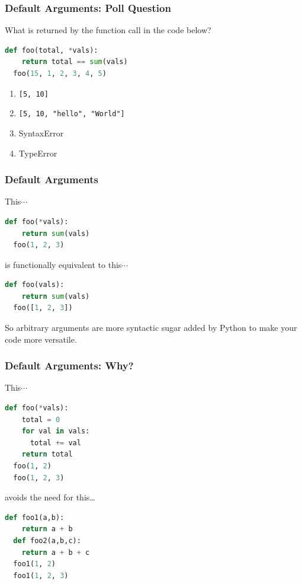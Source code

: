 \documentclass{beamer}
\begin{document}
%
%
\begin{frame}[fragile]
  \frametitle{Default Arguments: Poll Question}
  What is returned by the function call in the code below?
  \begin{lstlisting}[language=Python, autogobble]
  def foo(total, *vals):
    return total == sum(vals)
  foo(15, 1, 2, 3, 4, 5)
  \end{lstlisting}
  \vfill
  \begin{enumerate}[A]
    \item \lstinline|[5, 10]|
    \item \lstinline|[5, 10, "hello", "World"]|
    \item SyntaxError
    \item TypeError
  \end{enumerate}
\end{frame}

%
%
\begin{frame}[fragile]
  \frametitle{Default Arguments}
  This$\cdots$
  \vfill
  \begin{lstlisting}[language=Python, autogobble]
  def foo(*vals):
    return sum(vals)
  foo(1, 2, 3)
  \end{lstlisting}
  \vfill
  is functionally equivalent to this$\cdots$
  \vfill
  \begin{lstlisting}[language=Python, autogobble]
  def foo(vals):
    return sum(vals)
  foo([1, 2, 3])
  \end{lstlisting}
  \vfill
  So arbitrary arguments are more syntactic sugar added by Python to make your code more versatile.
\end{frame}

%
%
\begin{frame}[fragile]
  \frametitle{Default Arguments: Why?}
  This$\cdots$
  \vfill
  \begin{lstlisting}[language=Python, autogobble]
  def foo(*vals):
    total = 0
    for val in vals:
      total += val
    return total
  foo(1, 2)
  foo(1, 2, 3)
  \end{lstlisting}
  \vfill
  avoids the need for this\dots
  \vfill
  \begin{lstlisting}[language=Python, autogobble]
  def foo1(a,b):
    return a + b 
  def foo2(a,b,c):
    return a + b + c
  foo1(1, 2)
  foo1(1, 2, 3)
  \end{lstlisting}
  \vfill
\end{frame}
\end{document}
